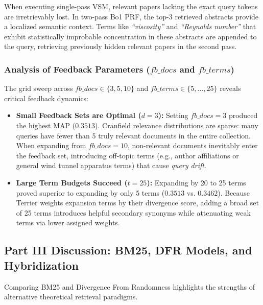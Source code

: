 \documentclass[10pt, a4paper]{article}
\begin{document}
When executing single-pass VSM, relevant papers lacking the exact query tokens are irretrievably lost. In two-pass Bo1 PRF, the top-3 retrieved abstracts provide a localized semantic context. Terms like \textit{``viscosity''} and \textit{``Reynolds number''} that exhibit statistically improbable concentration in these abstracts are appended to the query, retrieving previously hidden relevant papers in the second pass.

\subsubsection{Analysis of Feedback Parameters ($fb\_docs$ and $fb\_terms$)}
The grid sweep across $fb\_docs \in \{3, 5, 10\}$ and $fb\_terms \in \{5, \dots, 25\}$ reveals critical feedback dynamics:
\begin{itemize}[noitemsep,topsep=2pt]
    \item \textbf{Small Feedback Sets are Optimal ($d=3$):} Setting $fb\_docs = 3$ produced the highest MAP ($0.3513$). Cranfield relevance distributions are sparse: many queries have fewer than 5 truly relevant documents in the entire collection. When expanding from $fb\_docs = 10$, non-relevant documents inevitably enter the feedback set, introducing off-topic terms (e.g., author affiliations or general wind tunnel apparatus terms) that cause \textit{query drift}.
    \item \textbf{Large Term Budgets Succeed ($t=25$):} Expanding by 20 to 25 terms proved superior to expanding by only 5 terms ($0.3513$ vs. $0.3462$). Because Terrier weights expansion terms by their divergence score, adding a broad set of 25 terms introduces helpful secondary synonyms while attenuating weak terms via lower assigned weights.
\end{itemize}

\subsection{Part III Discussion: BM25, DFR Models, and Hybridization}
\label{sec:disc_part3}

Comparing BM25 and Divergence From Randomness highlights the strengths of alternative theoretical retrieval paradigms.
\end{document}

